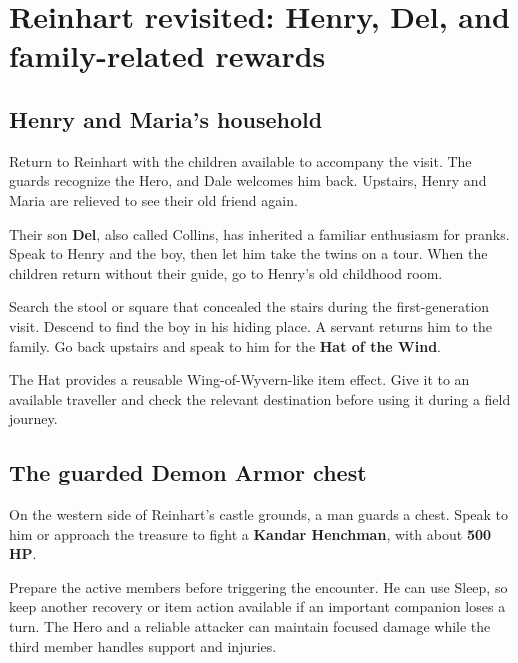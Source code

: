 \section{Reinhart revisited: Henry, Del, and family-related rewards}

\subsection*{Henry and Maria's household}

Return to Reinhart with the children available to accompany the
visit. The guards recognize the Hero, and Dale welcomes him back.
Upstairs, Henry and Maria are relieved to see their old friend again.

Their son \textbf{Del}, also called Collins, has inherited a
familiar enthusiasm for pranks. Speak to Henry and the boy, then
let him take the twins on a tour. When the children return without
their guide, go to Henry's old childhood room.

Search the stool or square that concealed the stairs during the
first-generation visit. Descend to find the boy in his hiding place.
A servant returns him to the family. Go back upstairs and speak
to him for the \textbf{Hat of the Wind}.


The Hat provides a reusable Wing-of-Wyvern-like item effect.
Give it to an available traveller and check the relevant destination
before using it during a field journey.

\subsection*{The guarded Demon Armor chest}

On the western side of Reinhart's castle grounds, a man guards
a chest. Speak to him or approach the treasure to fight a
\textbf{Kandar Henchman}, with about \textbf{500 HP}.


Prepare the active members before triggering the encounter. He can
use Sleep, so keep another recovery or item action available if
an important companion loses a turn. The Hero and a reliable
attacker can maintain focused damage while the third member handles
support and injuries.


